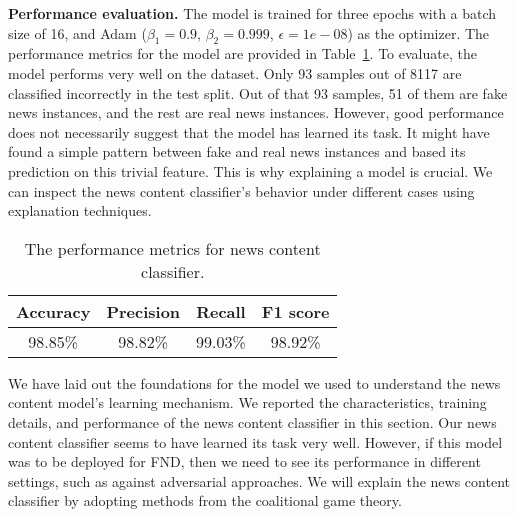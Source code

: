 \textbf{Performance evaluation.} The model is trained for three epochs with a batch size of 16, and Adam ($\beta_1=0.9$, $\beta_2=0.999$, $\epsilon=1e-08$) as the optimizer. The performance metrics for the model are provided in Table~\ref{tab:newsContentModelPerformanceMetrics}. To evaluate, the model performs very well on the dataset. Only 93 samples out of 8117 are classified incorrectly in the test split. Out of that 93 samples, 51 of them are fake news instances, and the rest are real news instances. However, good performance does not necessarily suggest that the model has learned its task. It might have found a simple pattern between fake and real news instances and based its prediction on this trivial feature. This is why explaining a model is crucial. We can inspect the news content classifier's behavior under different cases using explanation techniques.\\
\begin{table}
    \centering
    \begin{tabular}{c | c | c | c}
        \textbf{Accuracy} & \textbf{Precision} & \textbf{Recall} & \textbf{F1 score} \\
        \hline
        98.85\%           & 98.82\%            & 99.03\%         & 98.92\%           \\
    \end{tabular}
    \caption[The performance metrics for news content classifier.]{The performance metrics for news content classifier.}
    \label{tab:newsContentModelPerformanceMetrics}
\end{table}
We have laid out the foundations for the model we used to understand the news content model's learning mechanism. We reported the characteristics, training details, and performance of the news content classifier in this section. Our news content classifier seems to have learned its task very well. However, if this model was to be deployed for FND, then we need to see its performance in different settings, such as against adversarial approaches. We will explain the news content classifier by adopting methods from the coalitional game theory.

